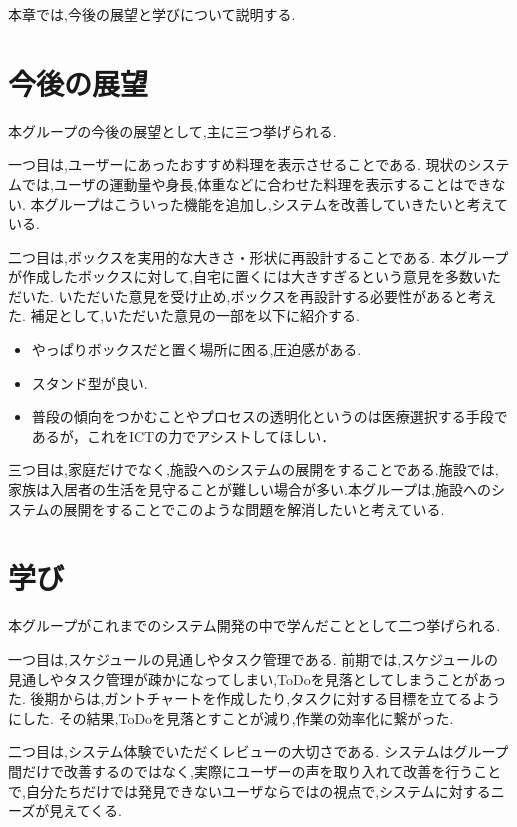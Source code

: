 \documentclass[../report]{subfiles}
\begin{document}
本章では,今後の展望と学びについて説明する.

\section{今後の展望}
本グループの今後の展望として,主に三つ挙げられる.

一つ目は,ユーザーにあったおすすめ料理を表示させることである.
現状のシステムでは,ユーザの運動量や身長,体重などに合わせた料理を表示することはできない.
本グループはこういった機能を追加し,システムを改善していきたいと考えている.

二つ目は,ボックスを実用的な大きさ・形状に再設計することである.
本グループが作成したボックスに対して,自宅に置くには大きすぎるという意見を多数いただいた.
いただいた意見を受け止め,ボックスを再設計する必要性があると考えた.
補足として,いただいた意見の一部を以下に紹介する.

\begin{itemize}
    \item やっぱりボックスだと置く場所に困る,圧迫感がある.
    \item スタンド型が良い.
    \item 普段の傾向をつかむことやプロセスの透明化というのは医療選択する手段であるが，これをICTの力でアシストしてほしい．
\end{itemize}

三つ目は,家庭だけでなく,施設へのシステムの展開をすることである.施設では,家族は入居者の生活を見守ることが難しい場合が多い.本グループは,施設へのシステムの展開をすることでこのような問題を解消したいと考えている.

\section{学び}
本グループがこれまでのシステム開発の中で学んだこととして二つ挙げられる.

一つ目は,スケジュールの見通しやタスク管理である.
前期では,スケジュールの見通しやタスク管理が疎かになってしまい,ToDoを見落としてしまうことがあった.
後期からは,ガントチャートを作成したり,タスクに対する目標を立てるようにした.
その結果,ToDoを見落とすことが減り,作業の効率化に繋がった.

二つ目は,システム体験でいただくレビューの大切さである.
システムはグループ間だけで改善するのではなく,実際にユーザーの声を取り入れて改善を行うことで,自分たちだけでは発見できないユーザならではの視点で,システムに対するニーズが見えてくる.
\end{document}
